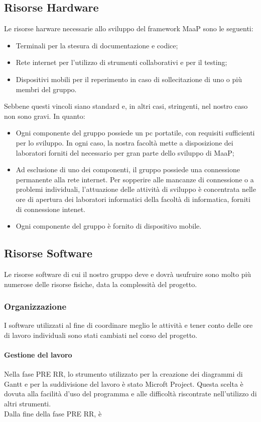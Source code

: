 \subsection{Risorse Hardware}
Le risorse harware necessarie allo sviluppo del framework MaaP sono le seguenti:
\begin{itemize}
\item Terminali per la stesura di documentazione e codice;
\item Rete internet per l'utilizzo di strumenti collaborativi e per il testing;
\item Dispositivi mobili per il reperimento in caso di sollecitazione di uno o più membri del gruppo.
\end{itemize}
Sebbene questi vincoli siano standard e, in altri casi, stringenti, nel nostro caso non sono gravi. In quanto:
\begin{itemize}
\item Ogni componente del gruppo possiede un pc portatile, con requisiti sufficienti per lo sviluppo. In ogni caso, la nostra facoltà mette a disposizione dei laboratori forniti del necessario per gran parte dello sviluppo di MaaP;
\item Ad esclusione di uno dei componenti, il gruppo possiede una connessione permanente alla rete internet. Per sopperire alle mancanze di connessione o a problemi individuali, l'attuazione delle attività di sviluppo è concentrata nelle ore di apertura dei laboratori informatici della facoltà di informatica, forniti di connessione intenet.
\item Ogni componente del gruppo è fornito di dispositivo mobile. 
\end{itemize}

\subsection{Risorse Software}
Le risorse software di cui il nostro gruppo deve e dovrà usufruire sono molto più numerose delle risorse fisiche, data la complessità del progetto. 
\subsubsection{Organizzazione}
I software utilizzati al fine di coordinare meglio le attività e tener conto delle ore di lavoro individuali sono stati cambiati nel corso del progetto.\\
\paragraph{Gestione del lavoro}
Nella fase PRE RR, lo strumento utilizzato per la creazione dei diagrammi di Gantt e per la suddivisione del lavoro è stato Microft Project. Questa scelta è dovuta alla facilità d'uso del programma e alle difficoltà riscontrate nell'utilizzo di altri strumenti.\\
Dalla fine della fase PRE RR, è
